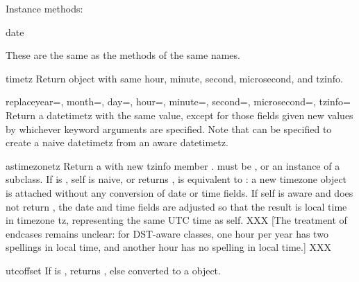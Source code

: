 Instance methods:

\begin{methoddesc}{date}{}

These are the same as the  methods of the same names.
\end{methoddesc}

\begin{methoddesc}{timetz}{}
    Return  object with same hour, minute, second, microsecond,
    and tzinfo.
\end{methoddesc}

\begin{methoddesc}{replace}{year=, month=, day=, hour=, minute=, second=, microsecond=,
            tzinfo=}
    Return a datetimetz with the same value, except for those fields given
    new values by whichever keyword arguments are specified.  Note that
     can be specified to create a naive datetimetz from
    an aware datetimetz.
\end{methoddesc}

\begin{methoddesc}{astimezone}{tz}
    Return a  with new tzinfo member .  
    must be , or an instance of a  subclass.  If
     is , self is naive, or
     returns ,
     is equivalent to
    :  a new timezone object is attached
    without any conversion of date or time fields.  If self is aware and
     does not return , the date and
    time fields are adjusted so that the result is local time in timezone
    tz, representing the same UTC time as self.
    XXX [The treatment of endcases remains unclear:  for DST-aware
    classes, one hour per year has two spellings in local time, and
    another hour has no spelling in local time.] XXX
\end{methoddesc}

\begin{methoddesc}{utcoffset}{}
    If  is , returns , else
     converted to a 
    object.
\end{methoddesc}

